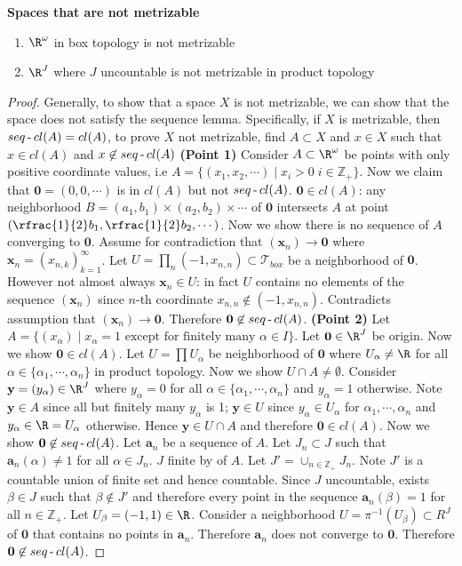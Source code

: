 \documentclass[10.5pt]{article}
\newcommand{\Z}{\mathbb{Z}}
\newcommand{\calT}{\mathcal{T}}
\newcommand{\ba}{\mathbf{a}}
\newcommand{\bx}{\mathbf{x}}
\newcommand{\by}{\mathbf{y}}
\DeclareMathOperator{\mdash}{{\hbox{-}}}
\begin{document}
\begin{defn*}
    \textbf{Spaces that are not metrizable}
    \begin{enumerate}
        \item $\R^{\omega}$ in box topology is not metrizable
        \item $\R^{J}$ where $J$ uncountable is not metrizable in product topology
    \end{enumerate}
    \begin{proof}
        Generally, to show that a space $X$ is not metrizable, we can show that the space does not satisfy the sequence lemma. Specifically, if $X$ is metrizable, then $seq\mdash cl(A) = cl(A)$, to prove $X$ not metrizable, find $A\subset X$ and $x\in X$ such that $x\in cl(A)$ and $x\not\in seq\mdash cl(A)$
        \textbf{(Point 1)}
        Consider $A\subset \R^{\omega}$ be points with only positive coordinate values, i.e $A = \{(x_1,x_2,\cdots) \mid x_i > 0 \; i\in \Z_+\}$. Now we claim that $\mathbf{0} = (0, 0, \cdots)$ is in $cl(A)$ but not $seq\mdash cl(A)$. $\mathbf{0}\in cl(A)$: any neighborhood $B = (a_1,b_1) \times (a_2,b_2) \times \cdots$ of $\mathbf{0}$ intersects $A$ at point $(\rfrac{1}{2}b_1, \rfrac{1}{2}b_2,\cdots)$. Now we show there is no sequence of $A$ converging to $\mathbf{0}$. Assume for contradiction that $(\bx_n) \to \mathbf{0}$ where $\bx_n = (x_{n,k})_{k=1}^{\infty}$. Let $U = \textstyle \prod_n (-1, x_{n,n}) \subset \calT_{box}$ be a neighborhood of $\mathbf{0}$. However not almost always $\bx_n \in U$: in fact $U$ contains no elements of the sequence $(\bx_n)$ since $n$-th coordinate $x_{n,n} \not\in (-1, x_{n,n})$. Contradicts assumption that $(\bx_n) \to \mathbf{0}$. Therefore $\mathbf{0} \not\in seq\mdash cl(A)$.
        \textbf{(Point 2)} Let $A = \{(x_{\alpha}) \mid x_{\alpha} = 1\text{ except for finitely many } \alpha \in I\}$. Let $\mathbf{0} \in \R^J$ be origin. Now we show $\mathbf{0} \in cl(A)$. Let $U = \textstyle \prod U_{\alpha}$ be neighborhood of $\mathbf{0}$ where $U_{\alpha} \neq \R$ for all $\alpha \in \{\alpha_1, \cdots, \alpha_n\}$ in product topology. Now we show $U\cap A \neq \emptyset$. Consider $\by = (y_{\alpha}) \in \R^J$ where $y_{\alpha} = 0$ for all $\alpha\in \{\alpha_1, \cdots, \alpha_n\}$ and $y_{\alpha} = 1$ otherwise. Note $\by \in A$ since all but finitely many $y_{\alpha}$ is 1; $\by \in U$ since $y_{\alpha} \in U_{\alpha}$ for $\alpha_1, \cdots, \alpha_n$ and $y_{\alpha} \in \R = U_{\alpha}$ otherwise. Hence $\by \in U\cap A$ and therefore $\mathbf{0} \in cl(A)$. Now we show $\mathbf{0} \not\in seq\mdash cl(A)$. Let $\ba_n$ be a sequence of $A$. Let $J_n \subset J$ such that $\ba_n(\alpha) \neq 1$ for all $\alpha \in J_n$. $J$ finite by of $A$. Let $J' = \textstyle \cup_{n\in \Z_+} J_n$. Note $J'$ is a countable union of finite set and hence countable. Since $J$ uncountable, exists $\beta\in J$ such that $\beta \not\in J'$ and therefore every point in the sequence $\ba_n (\beta) = 1$ for all $n\in \Z_+$. Let $U_{\beta} = (-1,1) \in \R$. Consider a neighborhood $U = \pi^{-1}(U_{\beta}) \subset R^J$ of $\mathbf{0}$ that contains no points in $\ba_n$. Therefore $\ba_n$ does not converge to $\mathbf{0}$. Therefore $\mathbf{0} \not\in seq\mdash cl(A)$.

\end{proof}
\end{defn*}
\end{document}
